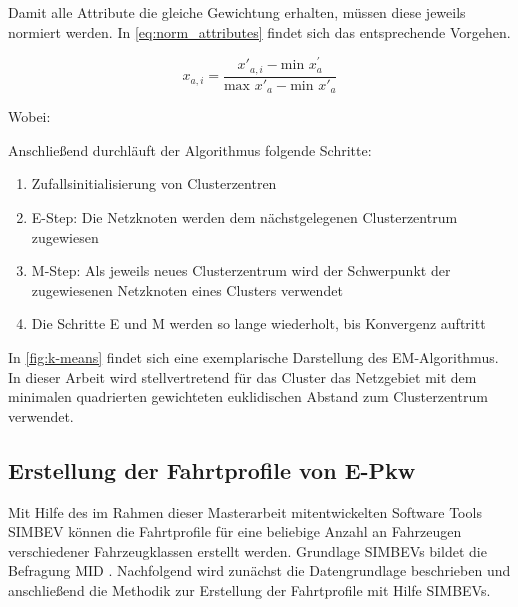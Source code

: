Damit alle Attribute die gleiche Gewichtung erhalten, müssen diese jeweils normiert werden.
In \autoref{eq:norm_attributes} findet sich das entsprechende Vorgehen.

\begin{equation}
	x_{a, i} = \frac{x'_{a, i} - \text{min~} x^{'}_a}{\text{max~} x'_a - \text{min~} x'_a}
	\label{eq:norm_attributes}
\end{equation}

\noindent Wobei:


\noindent Anschließend durchläuft der Algorithmus folgende Schritte:

\begin{enumerate}
	\item Zufallsinitialisierung von Clusterzentren
	\item E-Step: Die Netzknoten werden dem nächstgelegenen Clusterzentrum zugewiesen
	\item M-Step: Als jeweils neues Clusterzentrum wird der Schwerpunkt der zugewiesenen Netzknoten eines Clusters verwendet
	\item Die Schritte E und M werden so lange wiederholt, bis Konvergenz auftritt
\end{enumerate}


In \autoref{fig:k-means} findet sich eine exemplarische Darstellung des EM-Algorithmus.
In dieser Arbeit wird stellvertretend für das Cluster das Netzgebiet mit dem minimalen quadrierten gewichteten euklidischen Abstand zum Clusterzentrum verwendet. \cite{Mueller2019}




\subsection{Erstellung der Fahrtprofile von E-Pkw}\label{chap:simbev_theo}

Mit Hilfe des im Rahmen dieser Masterarbeit mitentwickelten Software Tools \gls{SIMBEV} können die Fahrtprofile für eine beliebige Anzahl an Fahrzeugen verschiedener Fahrzeugklassen erstellt werden.
Grundlage \glspl{SIMBEV} bildet die Befragung \gls{MID} \cite{ISGH2017}.
Nachfolgend wird zunächst die Datengrundlage beschrieben und anschließend die Methodik zur Erstellung der Fahrtprofile mit Hilfe \glspl{SIMBEV}.


